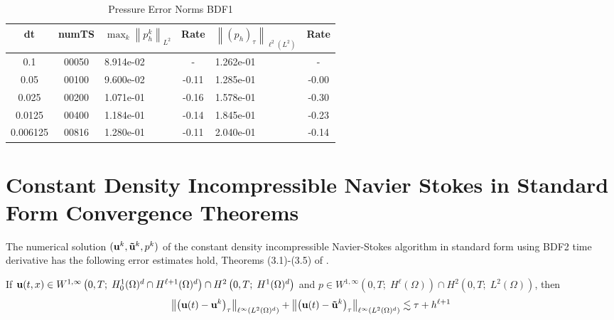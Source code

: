 \documentclass[letterpaper]{erdc}
\begin{document}
\begin{table}[h!]
  \begin{center}
    \caption{Pressure Error Norms BDF1}
    \begin{tabular}{c|c|l|c|l|c}
      dt & numTS &  $\displaystyle\max_{k} \left\|p^{k}_{h}\right\|_{L^2}$ &  Rate  &  $\left\|\left(p_h\right)_{\tau}\right\|_{\ell^2(L^2)}$  &  Rate\\
      \hline
      0.1     & 00050 &  8.914e-02  &  -  & 1.262e-01 &  -\\
      0.05    & 00100 &  9.600e-02  & -0.11  & 1.285e-01 & -0.00\\
      0.025   & 00200 &  1.071e-01  & -0.16  & 1.578e-01 & -0.30\\
      0.0125  & 00400 &  1.184e-01  & -0.14  & 1.845e-01 & -0.23\\
      0.006125 & 00816 &  1.280e-01  & -0.11  & 2.040e-01 & -0.14
    \end{tabular}
  \end{center}
\end{table}





\section{Constant Density Incompressible Navier Stokes in Standard Form Convergence Theorems}

The numerical solution $(\textbf{u}^k, \mathbf{\tilde{u}}^k,p^k)$ of the constant density incompressible Navier-Stokes algorithm in standard form using BDF2 time derivative has the following error estimates hold, Theorems (3.1)-(3.5) of \cite{guermond1997resultat}.

\begin{theorem}\label{thm:guermondthm3.1}
If $\textbf{u}(t,x)\in W^{1,\infty}\left(0,T;\; H_0^1(\Omega)^d \cap H^{\ell+1}(\Omega)^d  \right) \cap H^2\left(0,T;\; H^1(\Omega)^d\right)$ and $p\in W^{1,\infty}\left(0,T;\; H^{\ell}(\Omega) \right)\cap H^2\left(0,T;\; L^2(\Omega)\right)$, then
  \begin{equation}
    \left\| \left(\textbf{u}(t) - \textbf{u}^k \right)_{\tau} \right\|_{\ell^{\infty}\left(L^2(\Omega)^d\right)} + \left\| \left(\textbf{u}(t) - \mathbf{\tilde{u}}^k \right)_{\tau} \right\|_{\ell^{\infty}\left(L^2(\Omega)^d\right)} \lesssim \tau + h^{\ell+1}
  \end{equation}
\end{theorem}
\end{document}
